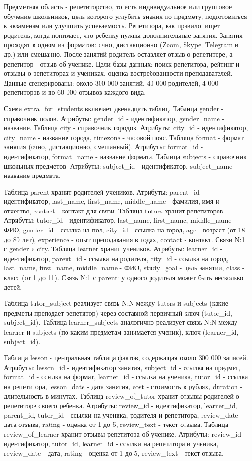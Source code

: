 \documentclass[areasetadvanced]{scrartcl}
\begin{document}
Предметная область - репетиторство, то есть индивидуальное или групповое обучение школьников, цель которого углубить знания по предмету,
подготовиться к экзаменам или улучшить успеваемость. Репетитора, как правило, ищет родитель, когда понимает, что ребенку нужны дополнительные занятия.
Занятия проходят в одном из форматов: очно, дистанционно (Zoom, Skype, Telegram и др.) или смешанно. После занятий родитель оставляет отзыв о репетиторе,
а репетитор - отзыв об ученике. Цели базы данных: поиск репетитора, рейтинг и отзывы о репетиторах и учениках, оценка востребованности преподавателей.
Данные сгенерированы: около 300 000 занятий, 40 000 родителей, 4 000 репетиторов и по 60 000 отзывов каждого вида.

Схема extra\_for\_students включает двенадцать таблиц.
Таблица gender - справочник полов. Атрибуты: gender\_id - идентификатор, gender\_name - название.
Таблица city - справочник городов. Атрибуты: city\_id - идентификатор, city\_name - название города, timezone - часовой пояс.
Таблица format - формат занятия (очно, дистанционно, смешанный). Атрибуты: format\_id - идентификатор, format\_name - название формата.
Таблица subjects - справочник школьных предметов. Атрибуты: subject\_id - идентификатор, subject\_name - название предмета.

Таблица parent хранит родителей учеников. Атрибуты: parent\_id - идентификатор, last\_name, first\_name, middle\_name - фамилия, имя и отчество, contact - контакт для связи.
Таблица tutors хранит репетиторов. Атрибуты: tutor\_id - идентификатор, last\_name, first\_name, middle\_name - ФИО, gender\_id - ссылка на пол, city\_id - ссылка на город,
age - возраст (от 18 до 80 лет), experience - опыт преподавания в годах, contact - контакт. Связи N:1 с gender и city.
Таблица learner хранит учеников. Атрибуты: learner\_id - идентификатор, parent\_id - ссылка на родителя, city\_id - ссылка на город, last\_name, first\_name, middle\_name - ФИО,
study\_goal - цель занятий, class - класс (от 1 до 11). Связь N:1 с parent: у одного родителя может быть несколько детей.

Таблица tutor\_subject реализует связь N:N между tutors и subjects (какие предметы преподает репетитор) через составной первичный ключ (tutor\_id, subject\_id).
Таблица learner\_subjects аналогично реализует связь N:N между learner и subjects (по каким предметам занимается ученик), ключ (learner\_id, subject\_id).

Таблица lesson - центральная таблица фактов, содержащая около 300 000 записей. Атрибуты: lesson\_id - идентификатор занятия, subject\_id - ссылка на предмет,
format\_id - ссылка на формат, learner\_id - ссылка на ученика, tutor\_id - ссылка на репетитора, lesson\_date - дата занятия, cost - стоимость в рублях, duration - длительность в минутах.
Таблица review\_of\_tutor хранит отзывы родителей о репетиторе своего ребенка. Атрибуты: review\_id - идентификатор, learner\_id, parent\_id, tutor\_id - ссылки на ученика, родителя и репетитора,
review\_date - дата отзыва, rating - оценка от 1 до 5, review\_text - текст отзыва.
Таблица review\_of\_learner хранит отзывы репетитора об ученике. Атрибуты: review\_id - идентификатор, tutor\_id, learner\_id - ссылки на репетитора и ученика,
review\_date - дата, rating - оценка от 1 до 5, review\_text - текст отзыва.
\end{document}
